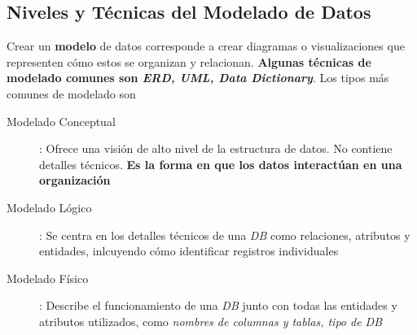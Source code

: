 \subsection{Niveles y Técnicas del Modelado de Datos}
Crear un \textbf{modelo} de datos corresponde a crear diagramas o visualizaciones que representen cómo estos se organizan y relacionan. \textbf{Algunas técnicas de modelado comunes son \textit{ERD, UML, Data Dictionary}}. Los tipos más comunes de modelado son 
\begin{description}
    \item[Modelado Conceptual]{ : Ofrece una visión de alto nivel de la estructura de datos. No contiene detalles técnicos. \textbf{Es la forma en que los datos interactúan en una organización}}
    \item[Modelado Lógico]{ : Se centra en los detalles técnicos de una \textit{DB} como relaciones, atributos y entidades, inlcuyendo cómo identificar registros individuales}
    \item[Modelado Físico]{ : Describe el funcionamiento de una \textit{DB} junto con todas las entidades y atributos utilizados, como \textit{ nombres de columnas y tablas, tipo de DB}} 
\end{description}

